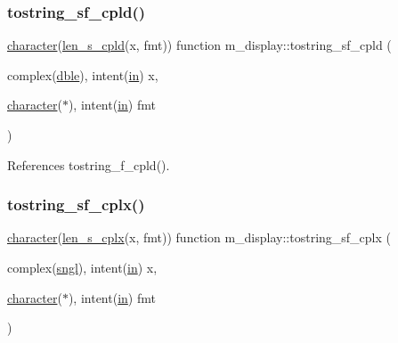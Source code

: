 \subsubsection{\texorpdfstring{tostring\+\_\+sf\+\_\+cpld()}{tostring\_sf\_cpld()}}
{\footnotesize\ttfamily \hyperlink{option__stopwatch_83_8txt_abd4b21fbbd175834027b5224bfe97e66}{character}(\hyperlink{namespacem__display_ace35690c2f36e28f07336cc7dcff47f4}{len\+\_\+s\+\_\+cpld}(x, fmt)) function m\+\_\+display\+::tostring\+\_\+sf\+\_\+cpld (\begin{DoxyParamCaption}\item[{complex(\hyperlink{namespacem__display_a46d90b75b6ccef7ccade133e5847e815}{dble}), intent(\hyperlink{M__journal_83_8txt_afce72651d1eed785a2132bee863b2f38}{in})}]{x,  }\item[{\hyperlink{option__stopwatch_83_8txt_abd4b21fbbd175834027b5224bfe97e66}{character}($\ast$), intent(\hyperlink{M__journal_83_8txt_afce72651d1eed785a2132bee863b2f38}{in})}]{fmt }\end{DoxyParamCaption})\hspace{0.3cm}{\ttfamily [private]}}



References tostring\+\_\+f\+\_\+cpld().

\mbox{\label{namespacem__display_a2a7022ce15edf03ceccb423e9da40c87}} 
\subsubsection{\texorpdfstring{tostring\+\_\+sf\+\_\+cplx()}{tostring\_sf\_cplx()}}
{\footnotesize\ttfamily \hyperlink{option__stopwatch_83_8txt_abd4b21fbbd175834027b5224bfe97e66}{character}(\hyperlink{namespacem__display_a7b573fb0cba7c7c954a820cdfe1c7968}{len\+\_\+s\+\_\+cplx}(x, fmt)) function m\+\_\+display\+::tostring\+\_\+sf\+\_\+cplx (\begin{DoxyParamCaption}\item[{complex(\hyperlink{namespacem__display_a2ac86bc535c3ccc5947dbb3109c666b5}{sngl}), intent(\hyperlink{M__journal_83_8txt_afce72651d1eed785a2132bee863b2f38}{in})}]{x,  }\item[{\hyperlink{option__stopwatch_83_8txt_abd4b21fbbd175834027b5224bfe97e66}{character}($\ast$), intent(\hyperlink{M__journal_83_8txt_afce72651d1eed785a2132bee863b2f38}{in})}]{fmt }\end{DoxyParamCaption})\hspace{0.3cm}{\ttfamily [private]}}



